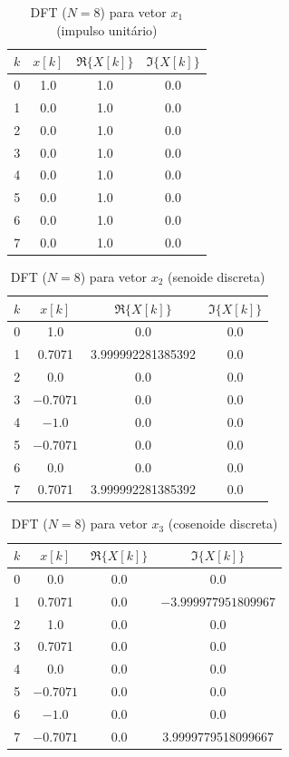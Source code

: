 \documentclass[12pt,a4paper]{article}
\begin{document}
\begin{table}[H]
\centering
\small
\caption{DFT ($N=8$) para vetor $x_1$ (impulso unitário)}
\label{tab:dft_x1}
\begin{tabular}{@{}c c c c@{}}
\toprule
\textbf{$k$} & \textbf{$x[k]$} & \textbf{$\Re\{X[k]\}$} & \textbf{$\Im\{X[k]\}$} \\
\midrule
0 & 1.0    & 1.0           & 0.0 \\
1 & 0.0    & 1.0           & 0.0 \\
2 & 0.0    & 1.0           & 0.0 \\
3 & 0.0    & 1.0           & 0.0 \\
4 & 0.0    & 1.0           & 0.0 \\
5 & 0.0    & 1.0           & 0.0 \\
6 & 0.0    & 1.0           & 0.0 \\
7 & 0.0    & 1.0           & 0.0 \\
\bottomrule
\end{tabular}
\end{table}

\begin{table}[H]
\centering
\small
\caption{DFT ($N=8$) para vetor $x_2$ (senoide discreta)}
\label{tab:dft_x2}
\begin{tabular}{@{}c c c c@{}}
\toprule
\textbf{$k$} & \textbf{$x[k]$} & \textbf{$\Re\{X[k]\}$} & \textbf{$\Im\{X[k]\}$} \\
\midrule
0 & 1.0     & 0.0 & 0.0 \\
1 & 0.7071  & 3.999992281385392 & 0.0 \\
2 & 0.0     & 0.0 & 0.0 \\
3 & $-0.7071$ & 0.0 & 0.0 \\
4 & $-1.0$  & 0.0 & 0.0 \\
5 & $-0.7071$ & 0.0 & 0.0 \\
6 & 0.0     & 0.0 & 0.0 \\
7 & 0.7071  & 3.999992281385392 & 0.0 \\
\bottomrule
\end{tabular}
\end{table}

\begin{table}[H]
\centering
\small
\caption{DFT ($N=8$) para vetor $x_3$ (cosenoide discreta)}
\label{tab:dft_x3}
\begin{tabular}{@{}c c c c@{}}
\toprule
\textbf{$k$} & \textbf{$x[k]$} & \textbf{$\Re\{X[k]\}$} & \textbf{$\Im\{X[k]\}$} \\
\midrule
0 & 0.0     & 0.0 & 0.0 \\
1 & 0.7071  & 0.0 & $-3.999977951809967$ \\
2 & 1.0     & 0.0 & 0.0 \\
3 & 0.7071  & 0.0 & 0.0 \\
4 & 0.0     & 0.0 & 0.0 \\
5 & $-0.7071$ & 0.0 & 0.0 \\
6 & $-1.0$  & 0.0 & 0.0 \\
7 & $-0.7071$ & 0.0 & 3.9999779518099667 \\
\bottomrule
\end{tabular}
\end{table}
\end{document}
